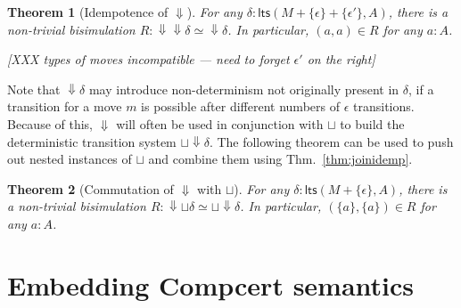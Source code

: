 \documentclass[11pt]{article}
\newcommand{\kw}[1]{{\mathsf{#1}}}
\newtheorem{theorem}{Theorem}
\begin{document}
\begin{theorem}[Idempotence of $\Downarrow$]
\label{thm:bsidemp}
For any $\delta : \kw{lts}(M + \{\epsilon\} + \{\epsilon'\}, A)$,
there is a non-trivial bisimulation
$R : {\Downarrow}{\Downarrow} \delta \simeq {\Downarrow}\delta$.
In particular, $(a, a) \in R$ for any $a : A$.

[XXX types of moves incompatible ---
need to forget $\epsilon'$ on the right]
\end{theorem}

Note that ${\Downarrow} \delta$ may introduce non-determinism
not originally present in $\delta$,
if a transition for a move $m$ is possible
after different numbers of $\epsilon$ transitions.
Because of this,
$\Downarrow$ will often be used in conjunction with $\sqcup$
to build the deterministic transition system ${\sqcup}{\Downarrow}\delta$.
The following theorem can be used to push out
nested instances of $\sqcup$ and
combine them using Thm.~\ref{thm:joinidemp}.

\begin{theorem}[Commutation of $\Downarrow$ with $\sqcup$]
For any $\delta : \kw{lts}(M + \{\epsilon\}, A)$,
there is a non-trivial bisimulation
$R : {\Downarrow}{\sqcup}\delta \simeq {\sqcup}{\Downarrow}\delta$.
In particular, $(\{a\}, \{a\}) \in R$ for any $a : A$.
\end{theorem}







\section{Embedding Compcert semantics}
\end{document}
